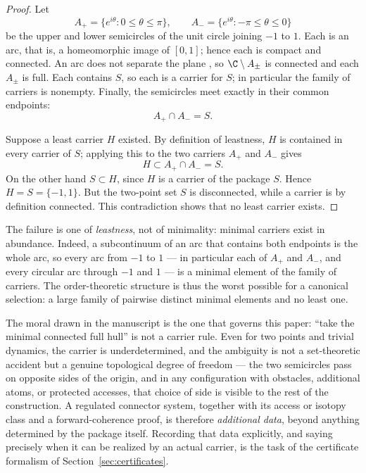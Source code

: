 \begin{proof}
Let
\[
A_+=\{e^{i\theta}:0\le\theta\le\pi\},
\qquad
A_-=\{e^{i\theta}:-\pi\le\theta\le 0\}
\]
be the upper and lower semicircles of the unit circle joining $-1$ to $1$.
Each is an arc, that is, a homeomorphic image of $[0,1]$; hence each is
compact and connected. An arc does not separate the plane
\cite{New51}, so $\C\setminus A_\pm$ is connected and each $A_\pm$ is full.
Each contains $S$, so each is a carrier for $S$; in particular the family of
carriers is nonempty. Finally, the semicircles meet exactly in their common
endpoints:
\[
A_+\cap A_-=S .
\]

Suppose a least carrier $H$ existed. By definition of leastness, $H$ is
contained in every carrier of $S$; applying this to the two carriers $A_+$
and $A_-$ gives
\[
H\subset A_+\cap A_-=S .
\]
On the other hand $S\subset H$, since $H$ is a carrier of the package $S$.
Hence $H=S=\{-1,1\}$. But the two-point set $S$ is disconnected, while a
carrier is by definition connected. This contradiction shows that no least
carrier exists.
\end{proof}

The failure is one of \emph{leastness}, not of minimality: minimal carriers
exist in abundance. Indeed, a subcontinuum of an arc that contains both
endpoints is the whole arc, so every arc from $-1$ to $1$ --- in particular
each of $A_+$ and $A_-$, and every circular arc through $-1$ and $1$ --- is a
minimal element of the family of carriers. The order-theoretic structure is
thus the worst possible for a canonical selection: a large family of pairwise
distinct minimal elements and no least one.

The moral drawn in the manuscript is the one that governs this paper: ``take
the minimal connected full hull'' is not a carrier rule. Even for two points
and trivial dynamics, the carrier is underdetermined, and the ambiguity is not
a set-theoretic accident but a genuine topological degree of freedom --- the
two semicircles pass on opposite sides of the origin, and in any configuration
with obstacles, additional atoms, or protected accesses, that choice of side
is visible to the rest of the construction. A regulated connector system,
together with its access or isotopy class and a forward-coherence proof, is
therefore \emph{additional data}, beyond anything determined by the package
itself. Recording that data explicitly, and saying precisely when it can be
realized by an actual carrier, is the task of the certificate formalism of
Section~\ref{sec:certificates}.

